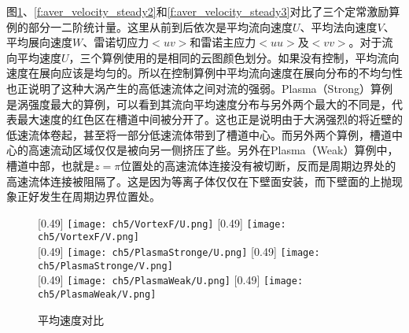 图\ref{f:aver_velocity_steady1}、\ref{f:aver_velocity_steady2}和\ref{f:aver_velocity_steady3}对比了三个定常激励算例的部分一二阶统计量。这里从前到后依次是平均流向速度$U$、平均法向速度$V$、平均展向速度$W$、雷诺切应力$<uv>$和雷诺主应力$<uu>$及$<vv>$。对于流向平均速度$U$，三个算例使用的是相同的云图颜色划分。如果没有控制，平均流向速度在展向应该是均匀的。所以在控制算例中平均流向速度在展向分布的不均匀性也正说明了这种大涡产生的高低速流体之间对流的强弱。Plasma（Strong）算例是涡强度最大的算例，可以看到其流向平均速度分布与另外两个最大的不同是，代表最大速度的红色区在槽道中间被分开了。这也正是说明由于大涡强烈的将近壁的低速流体卷起，甚至将一部分低速流体带到了槽道中心。而另外两个算例，槽道中心的高速流动区域仅仅是被向另一侧挤压了些。另外在Plasma（Weak）算例中，槽道中部，也就是$z=\pi$位置处的高速流体连接没有被切断，反而是周期边界处的高速流体连接被阻隔了。这是因为等离子体仅仅在下壁面安装，而下壁面的上抛现象正好发生在周期边界位置处。
\begin{figure}[htb]
  \centering
  [0.49\textwidth]
    {\texttt{[image: ch5/VortexF/U.png]}}
  [0.49\textwidth]
    {\texttt{[image: ch5/VortexF/V.png]}}
  \\\bigskip
  [0.49\textwidth]
    {\texttt{[image: ch5/PlasmaStronge/U.png]}}
  [0.49\textwidth]
    {\texttt{[image: ch5/PlasmaStronge/V.png]}}
  \\\bigskip
  [0.49\textwidth]
    {\texttt{[image: ch5/PlasmaWeak/U.png]}}
  [0.49\textwidth]
    {\texttt{[image: ch5/PlasmaWeak/V.png]}}
  \caption{平均速度对比}\label{f:aver_velocity_steady1}
\end{figure}

